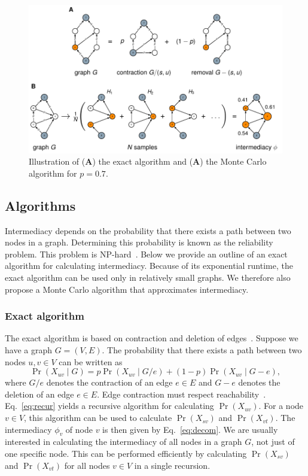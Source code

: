\documentclass[9pt,twocolumn,twoside,lineno]{pnas-alt}
\theoremstyle{definition}
\renewcommand{\eqref}[1]{Eq.~\ref{eq:#1}\xspace}
\begin{document}
{\begin{sansmath}\begin{figure}
    \centering%
    \includegraphics[width=11.4cm]{algorithms}
    \caption{Illustration of (\textbf{A}) the exact algorithm and (\textbf{A}) the Monte Carlo algorithm for $p = 0.7$.}
    \label{fig:algorithms}
\end{figure}\end{sansmath}

\subsection*{\label{sec:algorithms}Algorithms}

Intermediacy depends on the probability that there exists a path between two nodes in a graph. Determining this probability is known as the reliability problem. This problem is NP-hard~\cite{Ball1980}. Below we provide an outline of an exact algorithm for calculating intermediacy. Because of its exponential runtime, the exact algorithm can be used only in relatively small graphs. We therefore also propose a Monte Carlo algorithm that approximates intermediacy.

\subsubsection*{\label{sec:algorithm}Exact algorithm}

The exact algorithm is based on contraction and deletion of edges~\cite{Moskowitz1958}. Suppose we have a graph $G = (V, E)$. The probability that there exists a path between two nodes $u, v \in V$ can be written as
\begin{equation}
    \Pr(X_{uv} \mid G) = p\Pr(X_{uv} \mid G / e) + (1 - p)\Pr(X_{uv} \mid G - e),
    \label{eq:recur}
\end{equation}
where $G / e$ denotes the contraction of an edge $e \in E$ and $G - e$ denotes the deletion of an edge $e \in E$. Edge contraction must respect reachability~\cite{Page1989}. \eqref{recur} yields a recursive algorithm for calculating $\Pr(X_{uv})$. For a node $v \in V$, this algorithm can be used to calculate $\Pr(X_{sv})$ and $\Pr(X_{vt})$. The intermediacy $\phi_v$ of node $v$ is then given by \eqref{decom}. We are usually interested in calculating the intermediacy of all nodes in a graph $G$, not just of one specific node. This can be performed efficiently by calculating $\Pr(X_{sv})$ and $\Pr(X_{vt})$ for all nodes $v \in V$ in a single recursion.

}
\end{document}
